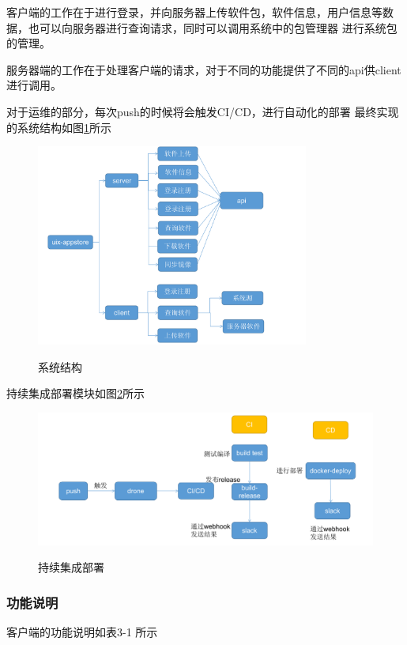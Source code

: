 \documentclass[supercite]{Experimental_Report}
\theoremstyle{definition}
\begin{document}
客户端的工作在于进行登录，并向服务器上传软件包，软件信息，用户信息等数据，也可以向服务器进行查询请求，同时可以调用系统中的包管理器
进行系统包的管理。

服务器端的工作在于处理客户端的请求，对于不同的功能提供了不同的api供client进行调用。

对于运维的部分，每次push的时候将会触发CI/CD，进行自动化的部署
最终实现的系统结构如图\ref{struct}所示
\begin{figure}[!h]
    \caption{系统结构}
    \centering
    \includegraphics[width=0.8\textwidth]{./images/struct.png}
    \label{struct}
\end{figure}
\newpage

持续集成部署模块如图\ref{CID}所示
\begin{figure}[!h]
    \caption{持续集成部署}
    \centering
    \includegraphics[width=1\textwidth]{./images/CID.png}
    \label{CID}
\end{figure}

\subsubsection{功能说明}

客户端的功能说明如表3-1 所示
\end{document}
